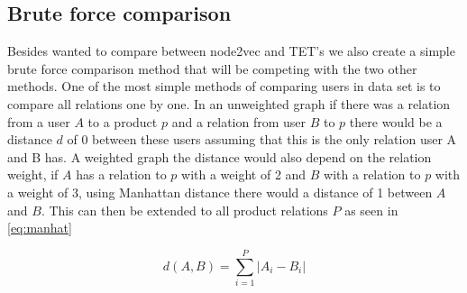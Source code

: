\subsection{Brute force comparison}\label{Subsec:brute_force}
Besides wanted to compare between node2vec and TET's we also create a simple brute force comparison method that will be competing with the two other methods.
One of the most simple methods of comparing users in data set is to compare all relations one by one. 
In an unweighted graph if there was a relation from a user $A$ to a product $p$ and a relation from user $B$ to $p$ there would be a distance $d$ of 0 between these users assuming that this is the only relation user A and B has. 
A weighted graph the distance would also depend on the relation weight, if $A$ has a relation to $p$ with a weight of 2 and $B$ with a relation to $p$ with a weight of 3, using Manhattan distance there would a distance of 1 between $A$ and $B$. 
This can then be extended to all product relations $P$ as seen in \autoref{eq:manhat}

\begin{equation}\label{eq:manhat}
	d(A,B) = \sum_{i=1}^{P} |A_i - B_i|
\end{equation}
